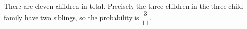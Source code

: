 There are eleven children in total. Precisely the three children in the three-child family have two siblings, so the probability is $\boxed{\dfrac{3}{11}}$.
